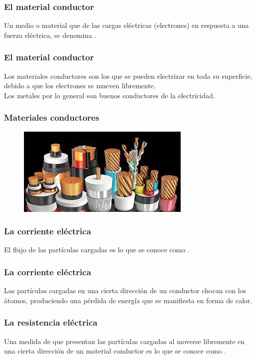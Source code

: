 \documentclass[14pt]{beamer}
\begin{document}
\begin{frame}
\frametitle{El material conductor}
Un medio o material que  de las cargas eléctricas (electrones)
en respuesta a una fuerza eléctrica, se denomina .
\end{frame}
\begin{frame}
\frametitle{El material conductor}    
Los materiales conductores son los que se pueden electrizar en toda su superficie, debido a que los electrones se mueven libremente.
\\
\bigskip
\pause
Los metales por lo general son buenos conductores de la electricidad.
\end{frame}
\begin{frame}
\frametitle{Materiales conductores}
\begin{figure}
    \centering
    \includegraphics[scale=0.8]{Imagenes/Materiales_Conductores_01.jpg}
\end{figure}
\end{frame}
\begin{frame}
\frametitle{La corriente eléctrica}
El flujo de las partículas cargadas es lo que se conoce como .
\end{frame}
\begin{frame}
\frametitle{La corriente eléctrica}
Las partículas cargadas en una cierta dirección de un conductor chocan con los átomos, \pause produciendo una pérdida de energía que se manifiesta en forma de calor.
\end{frame}
\begin{frame}
\frametitle{La resistencia eléctrica}
Una medida de  que presentan las partículas cargadas al moverse libremente en una cierta dirección de un material conductor \pause es lo que se conoce como .
\end{frame}
\end{document}
